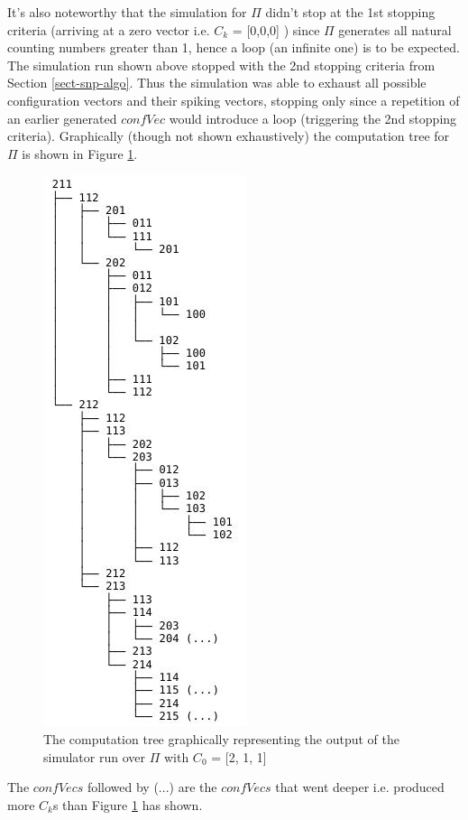 \documentclass{acm_proc_article-sp}
\begin{document}
 It's also noteworthy that the simulation for $\Pi$ didn't stop at the 1st stopping criteria (arriving at a zero vector i.e. $C_k$ = [0,0,0] ) since $\Pi$ generates  all natural counting numbers greater than 1, hence a loop (an infinite one) is to be expected. The simulation run shown above stopped with the 2nd stopping criteria from Section \ref{sect-snp-algo}. Thus the simulation was able to exhaust all possible configuration vectors and their spiking vectors, stopping only since a repetition of an earlier generated $confVec$ would introduce a loop (triggering the 2nd stopping criteria).
Graphically (though not shown exhaustively) the computation tree for $\Pi$ is shown in Figure \ref{c211_tree}.

	\begin{figure}
		\centering
		\includegraphics[scale=.7]{c211_tree.jpeg} 
		\caption{The computation tree graphically representing the output of the simulator run over $\Pi$ with $C_0$ = [2, 1, 1]}
		\label{c211_tree}
	\end{figure}

The $confVecs$ followed by (...) are the $confVecs$ that went deeper i.e. produced more $C_k$s than Figure \ref{c211_tree} has shown.
\end{document}
